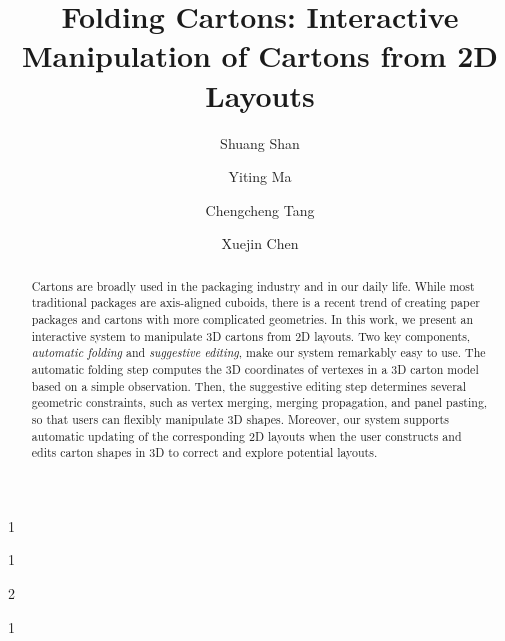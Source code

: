 \documentclass{gmp2018}
\begin{document}
%
%
\title{Folding Cartons: Interactive Manipulation of Cartons from 2D Layouts}

%

%
%
\author{Shuang Shan}{1}
\author{Yiting Ma}{1}
\author{Chengcheng Tang}{2}
\author{Xuejin Chen}{1}

%
%

%
%
 

 
\newcommand{\vo}{\hat{\mathbf{v}}}
\newcommand{\vn}{\mathbf{v}}
\newcommand{\vset}{\mathbb{V}}




\maketitle

\begin{abstract}
Cartons are broadly used in the packaging industry and in our daily life. While most traditional packages are axis-aligned cuboids, there is a recent trend of creating paper packages and cartons with more complicated geometries. In this work, we present an interactive system to manipulate 3D cartons from 2D layouts. Two key components, \emph{automatic folding} and \emph{suggestive editing}, make our system remarkably easy to use. 
The automatic folding step computes the 3D coordinates of vertexes in a 3D carton model based on a simple observation. Then, the suggestive editing step determines several geometric constraints, such as vertex merging, merging propagation, and panel pasting, so that users can flexibly manipulate 3D shapes.
Moreover, our system supports automatic updating of the corresponding 2D layouts when the user constructs and edits carton shapes in 3D to correct and explore potential layouts.  
\end{abstract}
\end{document}

